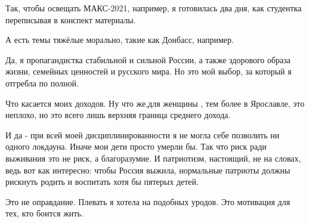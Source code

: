 Так, чтобы освещать МАКС-2021, например,  я готовилась два дня, как студентка
переписывая в конспект материалы. 

А есть темы тяжёлые морально, такие как Донбасс, например. 

Да, я пропагандистка стабильной и сильной России, а также здорового образа
жизни, семейных ценностей и русского мира. Но это мой выбор, за который я
отгребла по полной. 

Что касается моих доходов. Ну что же,для женщины , тем более в Ярославле, это
неплохо, но это всего лишь верхняя граница среднего дохода. 

И да - при всей моей дисциплинированности я не могла себе позволить ни одного
локдауна. Иначе мои дети просто умерли бы.  Так что  риск ради выживания это не
риск, а благоразумие. И патриотизм, настоящий, не на словах, ведь вот как
интересно: чтобы Россия выжила, нормальные патриоты должны рискнуть родить и
воспитать хотя бы пятерых детей. 

Это не оправдание. Плевать я хотела на подобных уродов. Это мотивация для тех,
кто боится жить.
